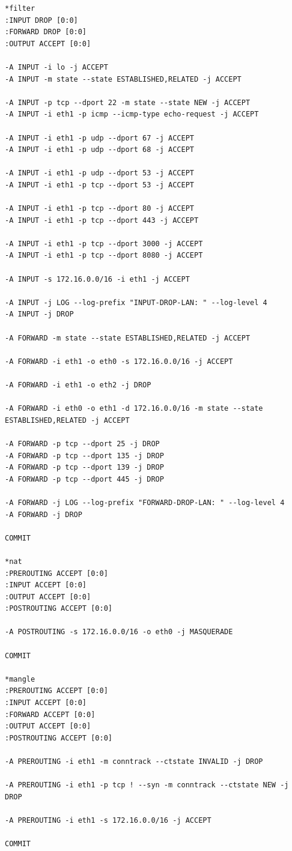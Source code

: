 \begin{verbatim}
*filter
:INPUT DROP [0:0]
:FORWARD DROP [0:0]
:OUTPUT ACCEPT [0:0]

-A INPUT -i lo -j ACCEPT
-A INPUT -m state --state ESTABLISHED,RELATED -j ACCEPT

-A INPUT -p tcp --dport 22 -m state --state NEW -j ACCEPT
-A INPUT -i eth1 -p icmp --icmp-type echo-request -j ACCEPT

-A INPUT -i eth1 -p udp --dport 67 -j ACCEPT
-A INPUT -i eth1 -p udp --dport 68 -j ACCEPT

-A INPUT -i eth1 -p udp --dport 53 -j ACCEPT
-A INPUT -i eth1 -p tcp --dport 53 -j ACCEPT

-A INPUT -i eth1 -p tcp --dport 80 -j ACCEPT
-A INPUT -i eth1 -p tcp --dport 443 -j ACCEPT

-A INPUT -i eth1 -p tcp --dport 3000 -j ACCEPT
-A INPUT -i eth1 -p tcp --dport 8080 -j ACCEPT

-A INPUT -s 172.16.0.0/16 -i eth1 -j ACCEPT

-A INPUT -j LOG --log-prefix "INPUT-DROP-LAN: " --log-level 4
-A INPUT -j DROP

-A FORWARD -m state --state ESTABLISHED,RELATED -j ACCEPT

-A FORWARD -i eth1 -o eth0 -s 172.16.0.0/16 -j ACCEPT

-A FORWARD -i eth1 -o eth2 -j DROP

-A FORWARD -i eth0 -o eth1 -d 172.16.0.0/16 -m state --state ESTABLISHED,RELATED -j ACCEPT

-A FORWARD -p tcp --dport 25 -j DROP
-A FORWARD -p tcp --dport 135 -j DROP
-A FORWARD -p tcp --dport 139 -j DROP
-A FORWARD -p tcp --dport 445 -j DROP

-A FORWARD -j LOG --log-prefix "FORWARD-DROP-LAN: " --log-level 4
-A FORWARD -j DROP

COMMIT

*nat
:PREROUTING ACCEPT [0:0]
:INPUT ACCEPT [0:0]
:OUTPUT ACCEPT [0:0]
:POSTROUTING ACCEPT [0:0]

-A POSTROUTING -s 172.16.0.0/16 -o eth0 -j MASQUERADE

COMMIT

*mangle
:PREROUTING ACCEPT [0:0]
:INPUT ACCEPT [0:0]
:FORWARD ACCEPT [0:0]
:OUTPUT ACCEPT [0:0]
:POSTROUTING ACCEPT [0:0]

-A PREROUTING -i eth1 -m conntrack --ctstate INVALID -j DROP

-A PREROUTING -i eth1 -p tcp ! --syn -m conntrack --ctstate NEW -j DROP

-A PREROUTING -i eth1 -s 172.16.0.0/16 -j ACCEPT

COMMIT
\end{verbatim}

